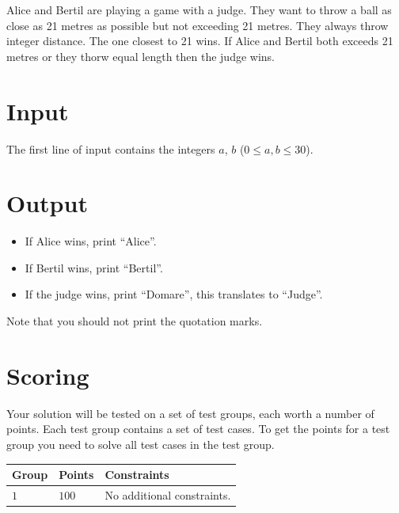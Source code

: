 Alice and Bertil are playing a game with a judge. They want to throw a ball as close as 21 metres 
as possible but not exceeding 21 metres. They always throw integer distance. The one closest to 21 wins. 
If Alice and Bertil both exceeds 21 metres or they thorw equal length then the judge wins.

\section*{Input}  
The first line of input contains the integers $a$, $b$ ($0 \leq a,b \leq 30$).


\section*{Output}  

\begin{itemize}
  \item If Alice wins, print ``Alice''.
  \item If Bertil wins, print ``Bertil''.
  \item If the judge wins, print ``Domare'', this translates to ``Judge''.
\end{itemize}
Note that you should not print the quotation marks.

\section*{Scoring}
Your solution will be tested on a set of test groups, each worth a number of points. Each test group contains
a set of test cases. To get the points for a test group you need to solve all test cases in the test group.

\noindent
\begin{tabular}{| l | l | p{12cm} |}
  \hline
  \textbf{Group} & \textbf{Points} & \textbf{Constraints} \\ \hline
  $1$    & $100$       & No additional constraints. \\ \hline
\end{tabular}